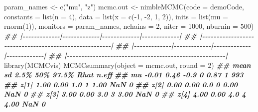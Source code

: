 \documentclass[
  12pt,
]{krantz}
\newenvironment{Shaded}{\begin{snugshade}}{\end{snugshade}}
\newcommand{\AttributeTok}[1]{\textcolor[rgb]{0.77,0.63,0.00}{#1}}
\newcommand{\DecValTok}[1]{\textcolor[rgb]{0.00,0.00,0.81}{#1}}
\newcommand{\DocumentationTok}[1]{\textcolor[rgb]{0.56,0.35,0.01}{\textbf{\textit{#1}}}}
\newcommand{\FunctionTok}[1]{\textcolor[rgb]{0.00,0.00,0.00}{#1}}
\newcommand{\NormalTok}[1]{#1}
\newcommand{\OtherTok}[1]{\textcolor[rgb]{0.56,0.35,0.01}{#1}}
\newcommand{\SpecialCharTok}[1]{\textcolor[rgb]{0.00,0.00,0.00}{#1}}
\newcommand{\StringTok}[1]{\textcolor[rgb]{0.31,0.60,0.02}{#1}}
\begin{document}
\begin{Shaded}
\begin{Highlighting}[]
\NormalTok{param\_names }\OtherTok{\textless{}{-}} \FunctionTok{c}\NormalTok{(}\StringTok{"mu"}\NormalTok{, }\StringTok{"z"}\NormalTok{)}
\NormalTok{mcmc.out }\OtherTok{\textless{}{-}} \FunctionTok{nimbleMCMC}\NormalTok{(}\AttributeTok{code =}\NormalTok{ demoCode, }
                      \AttributeTok{constants =} \FunctionTok{list}\NormalTok{(}\AttributeTok{n =} \DecValTok{4}\NormalTok{),}
                      \AttributeTok{data =} \FunctionTok{list}\NormalTok{(}\AttributeTok{x =} \FunctionTok{c}\NormalTok{(}\SpecialCharTok{{-}}\DecValTok{1}\NormalTok{, }\SpecialCharTok{{-}}\DecValTok{2}\NormalTok{, }\DecValTok{1}\NormalTok{, }\DecValTok{2}\NormalTok{)), }
                      \AttributeTok{inits =} \FunctionTok{list}\NormalTok{(}\AttributeTok{mu =} \FunctionTok{rnorm}\NormalTok{(}\DecValTok{1}\NormalTok{)),}
                      \AttributeTok{monitors =}\NormalTok{ param\_names,}
                      \AttributeTok{nchains =} \DecValTok{2}\NormalTok{, }
                      \AttributeTok{niter =} \DecValTok{1000}\NormalTok{,}
                      \AttributeTok{nburnin =} \DecValTok{500}\NormalTok{)}
\DocumentationTok{\#\# |{-}{-}{-}{-}{-}{-}{-}{-}{-}{-}{-}{-}{-}|{-}{-}{-}{-}{-}{-}{-}{-}{-}{-}{-}{-}{-}|{-}{-}{-}{-}{-}{-}{-}{-}{-}{-}{-}{-}{-}|{-}{-}{-}{-}{-}{-}{-}{-}{-}{-}{-}{-}{-}|}
\DocumentationTok{\#\# |{-}{-}{-}{-}{-}{-}{-}{-}{-}{-}{-}{-}{-}{-}{-}{-}{-}{-}{-}{-}{-}{-}{-}{-}{-}{-}{-}{-}{-}{-}{-}{-}{-}{-}{-}{-}{-}{-}{-}{-}{-}{-}{-}{-}{-}{-}{-}{-}{-}{-}{-}{-}{-}{-}{-}|}
\DocumentationTok{\#\# |{-}{-}{-}{-}{-}{-}{-}{-}{-}{-}{-}{-}{-}|{-}{-}{-}{-}{-}{-}{-}{-}{-}{-}{-}{-}{-}|{-}{-}{-}{-}{-}{-}{-}{-}{-}{-}{-}{-}{-}|{-}{-}{-}{-}{-}{-}{-}{-}{-}{-}{-}{-}{-}|}
\DocumentationTok{\#\# |{-}{-}{-}{-}{-}{-}{-}{-}{-}{-}{-}{-}{-}{-}{-}{-}{-}{-}{-}{-}{-}{-}{-}{-}{-}{-}{-}{-}{-}{-}{-}{-}{-}{-}{-}{-}{-}{-}{-}{-}{-}{-}{-}{-}{-}{-}{-}{-}{-}{-}{-}{-}{-}{-}{-}|}
\FunctionTok{library}\NormalTok{(MCMCvis)}
\FunctionTok{MCMCsummary}\NormalTok{(}\AttributeTok{object =}\NormalTok{ mcmc.out, }\AttributeTok{round =} \DecValTok{2}\NormalTok{)}
\DocumentationTok{\#\#       mean   sd 2.5\% 50\% 97.5\% Rhat n.eff}
\DocumentationTok{\#\# mu   {-}0.01 0.46 {-}0.9   0  0.87    1   993}
\DocumentationTok{\#\# z[1]  1.00 0.00  1.0   1  1.00  NaN     0}
\DocumentationTok{\#\# z[2]  0.00 0.00  0.0   0  0.00  NaN     0}
\DocumentationTok{\#\# z[3]  3.00 0.00  3.0   3  3.00  NaN     0}
\DocumentationTok{\#\# z[4]  4.00 0.00  4.0   4  4.00  NaN     0}
\end{Highlighting}
\end{Shaded}
\end{document}
